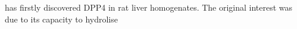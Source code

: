 \citet{Hopsu-Havu1966} has firstly discovered DPP4 in rat liver homogenates. The original interest was due to its capacity to hydrolise 